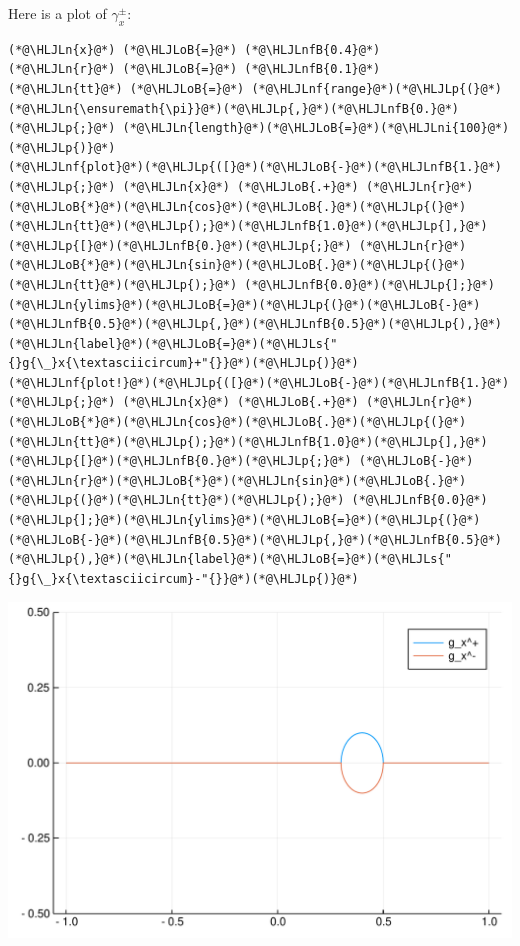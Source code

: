 \documentclass[12pt,a4paper]{article}
\newcommand{\HLJLn}[1]{#1}
\newcommand{\HLJLnf}[1]{\textcolor[RGB]{66,102,213}{#1}}
\newcommand{\HLJLs}[1]{\textcolor[RGB]{201,61,57}{#1}}
\newcommand{\HLJLnfB}[1]{\textcolor[RGB]{59,151,46}{#1}}
\newcommand{\HLJLni}[1]{\textcolor[RGB]{59,151,46}{#1}}
\newcommand{\HLJLoB}[1]{\textcolor[RGB]{102,102,102}{\textbf{#1}}}
\newcommand{\HLJLp}[1]{#1}
\begin{document}
Here is a plot of $\gamma_x^\pm$:


\begin{lstlisting}
(*@\HLJLn{x}@*) (*@\HLJLoB{=}@*) (*@\HLJLnfB{0.4}@*)
(*@\HLJLn{r}@*) (*@\HLJLoB{=}@*) (*@\HLJLnfB{0.1}@*)
(*@\HLJLn{tt}@*) (*@\HLJLoB{=}@*) (*@\HLJLnf{range}@*)(*@\HLJLp{(}@*)(*@\HLJLn{\ensuremath{\pi}}@*)(*@\HLJLp{,}@*)(*@\HLJLnfB{0.}@*)(*@\HLJLp{;}@*) (*@\HLJLn{length}@*)(*@\HLJLoB{=}@*)(*@\HLJLni{100}@*)(*@\HLJLp{)}@*)
(*@\HLJLnf{plot}@*)(*@\HLJLp{([}@*)(*@\HLJLoB{-}@*)(*@\HLJLnfB{1.}@*)(*@\HLJLp{;}@*) (*@\HLJLn{x}@*) (*@\HLJLoB{.+}@*) (*@\HLJLn{r}@*)(*@\HLJLoB{*}@*)(*@\HLJLn{cos}@*)(*@\HLJLoB{.}@*)(*@\HLJLp{(}@*)(*@\HLJLn{tt}@*)(*@\HLJLp{);}@*)(*@\HLJLnfB{1.0}@*)(*@\HLJLp{],}@*) (*@\HLJLp{[}@*)(*@\HLJLnfB{0.}@*)(*@\HLJLp{;}@*) (*@\HLJLn{r}@*)(*@\HLJLoB{*}@*)(*@\HLJLn{sin}@*)(*@\HLJLoB{.}@*)(*@\HLJLp{(}@*)(*@\HLJLn{tt}@*)(*@\HLJLp{);}@*) (*@\HLJLnfB{0.0}@*)(*@\HLJLp{];}@*)(*@\HLJLn{ylims}@*)(*@\HLJLoB{=}@*)(*@\HLJLp{(}@*)(*@\HLJLoB{-}@*)(*@\HLJLnfB{0.5}@*)(*@\HLJLp{,}@*)(*@\HLJLnfB{0.5}@*)(*@\HLJLp{),}@*)(*@\HLJLn{label}@*)(*@\HLJLoB{=}@*)(*@\HLJLs{"{}g{\_}x{\textasciicircum}+"{}}@*)(*@\HLJLp{)}@*)
(*@\HLJLnf{plot!}@*)(*@\HLJLp{([}@*)(*@\HLJLoB{-}@*)(*@\HLJLnfB{1.}@*)(*@\HLJLp{;}@*) (*@\HLJLn{x}@*) (*@\HLJLoB{.+}@*) (*@\HLJLn{r}@*)(*@\HLJLoB{*}@*)(*@\HLJLn{cos}@*)(*@\HLJLoB{.}@*)(*@\HLJLp{(}@*)(*@\HLJLn{tt}@*)(*@\HLJLp{);}@*)(*@\HLJLnfB{1.0}@*)(*@\HLJLp{],}@*) (*@\HLJLp{[}@*)(*@\HLJLnfB{0.}@*)(*@\HLJLp{;}@*) (*@\HLJLoB{-}@*)(*@\HLJLn{r}@*)(*@\HLJLoB{*}@*)(*@\HLJLn{sin}@*)(*@\HLJLoB{.}@*)(*@\HLJLp{(}@*)(*@\HLJLn{tt}@*)(*@\HLJLp{);}@*) (*@\HLJLnfB{0.0}@*)(*@\HLJLp{];}@*)(*@\HLJLn{ylims}@*)(*@\HLJLoB{=}@*)(*@\HLJLp{(}@*)(*@\HLJLoB{-}@*)(*@\HLJLnfB{0.5}@*)(*@\HLJLp{,}@*)(*@\HLJLnfB{0.5}@*)(*@\HLJLp{),}@*)(*@\HLJLn{label}@*)(*@\HLJLoB{=}@*)(*@\HLJLs{"{}g{\_}x{\textasciicircum}-"{}}@*)(*@\HLJLp{)}@*)
\end{lstlisting}

\includegraphics[width=\linewidth]{figures/Lecture12_3_1.pdf}
\end{document}
